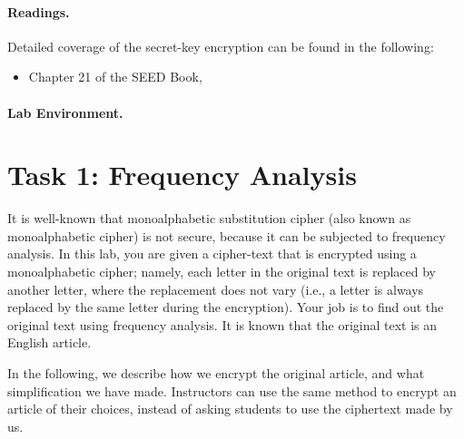 \paragraph{Readings.}
Detailed coverage of the secret-key encryption can be found in the following:

\begin{itemize}
\item Chapter 21 of the SEED Book, \seedbook
\end{itemize}


\paragraph{Lab Environment.} \seedenvironment




\section{Task 1: Frequency Analysis}

It is well-known that monoalphabetic substitution cipher (also known as monoalphabetic cipher) 
is not secure, because it can be subjected to frequency analysis. In this lab, you are given 
a cipher-text that is encrypted using a monoalphabetic cipher; namely,
each letter in the original text is replaced by another letter, 
where the replacement does not vary (i.e., a letter is always replaced by the same letter
during the encryption). Your job is to find out the original text using 
frequency analysis. It is known that the original text is an English article. 


In the following, we describe how we encrypt the original article, and what 
simplification we have made. Instructors can use the same
method to encrypt an article of their choices, instead of asking 
students to use the ciphertext made by us.

